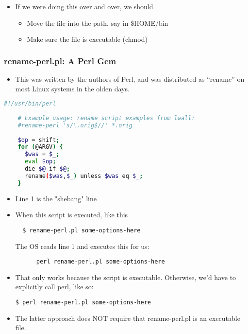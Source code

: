 \documentclass[English]{beamer}
\begin{document}
\begin{frame}
\begin{itemize}
\begin{itemize}
  \end{itemize}
\item If we were doing this over and over, we should
  \begin{itemize}
  \item Move the file into the path, say in \$HOME/bin
  \item Make sure the file is executable (chmod)
  \end{itemize} 
\end{itemize}
\end{frame}


\begin{frame}
  \frametitle{rename-perl.pl: A Perl Gem}

  \begin{itemize}
  \item This was written by the authors of Perl, and was distributed as
  ``rename'' on most Linux systems in the olden days. 
  \end{itemize}
  
  
  \begin{lstlisting}[basicstyle={\tiny},breaklines=true,language=bash] 
    #!/usr/bin/perl
    
    # Example usage: rename script examples from lwall:
    #rename-perl 's/\.orig$//' *.orig
    
    $op = shift;
    for (@ARGV) {
      $was = $_;
      eval $op;
      die $@ if $@;
      rename($was,$_) unless $was eq $_;
    }
  \end{lstlisting}
  
  \begin{itemize}
  \item Line 1 is the "shebang" line
  \item When this script is executed, like this
    \begin{lstlisting}
  $ rename-perl.pl some-options-here  
\end{lstlisting}
   The OS reads line 1 and executes this for us:
    \begin{lstlisting}
      perl rename-perl.pl some-options-here
    \end{lstlisting}
  \item That only works because the script is executable. Otherwise,
    we'd have to explicitly call perl, like so:
\begin{lstlisting}
$ perl rename-perl.pl some-options-here
\end{lstlisting}
  \item The latter approach does NOT require that rename-perl.pl is an
    executable file. 
  \end{itemize}

\end{frame}
\end{document}
